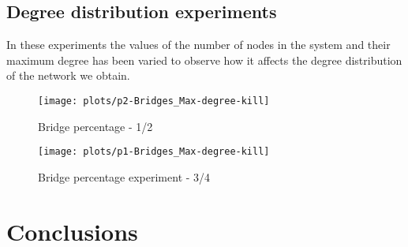 \documentclass{llncs}
\begin{document}
\subsection{Degree distribution experiments}
In these experiments the values of the number of nodes in the system and their maximum degree has been varied to observe how it affects the degree distribution of the network we obtain.
\begin{figure}[h!]
	\begin{minipage}{0.5\textwidth}
		\texttt{[image: plots/p2-Bridges\_Max-degree-kill]}
		\caption{Bridge percentage - 1/2}
		\label{fig:br1}
	\end{minipage}\hfill
	\begin{minipage}{0.5\textwidth}
		\centering
		\texttt{[image: plots/p1-Bridges\_Max-degree-kill]}
		\caption{Bridge percentage experiment - 3/4}
		\label{fig:br2}
	\end{minipage}
\end{figure}
%
\section{Conclusions} 
%
\begin{thebibliography}{}
	
\end{thebibliography}
\end{document}
